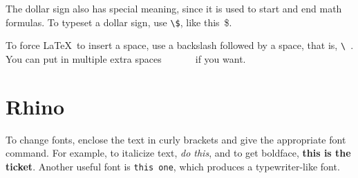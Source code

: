 The dollar sign also has special meaning, since it is used to start and end
math formulas. To typeset a dollar sign, use \verb+\$+, like this~\$.

To force \LaTeX\ to insert a space, use a backslash followed by
a space, that is, \verb+\ +. You can put in multiple extra spaces\ \ \ \ \ \ \ if you want.

\section{Rhino}

To change fonts, enclose the text in curly brackets and give the appropriate font command.
For example, to italicize text, {\it do this}, and to get boldface, {\bf this is the ticket}.
Another useful font is {\tt this one}, which produces a typewriter-like font.

